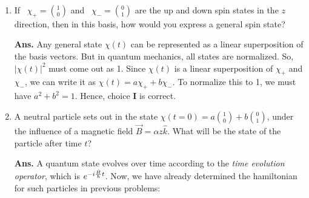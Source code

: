 \documentclass[12pt]{article}
\newcommand\ls{\left |}
\newcommand\rs{\right |}
\newcommand\tbf[1]{\textbf{#1}}
\newcommand\tans{\tbf{Ans. }}
\newcommand\h[1]{\hat{#1}}
\begin{document}
\begin{enumerate}[\bf 1.]
\vspace{1cm}
\item If ~$\chi_+ = { 1 \choose 0 }$ and ~$\chi_- = { 0 \choose 1 }$ are the up and down spin states in the $z$ direction, then in this basis, how would you express a general spin state?
\vspace{0.5cm}
\tans Any general state $\chi(t)$ can be represented as a linear superposition of the basis vectors. But in quantum mechanics, all states are normalized. So, $\ls \chi(t) \rs ^ 2$ must come out as 1. Since $\chi ( t )$ is a linear superposition of $\chi_+$ and $\chi_-$, we can write it as $\chi(t)=a \chi_+ + b \chi_-$. To normalize this to 1, we must have $a^2+b^2=1$. Hence, choice \tbf{I} is correct.
\vspace{1cm}
\item \label{prb:t_ev} A neutral particle sets out in the state $\chi(t=0) = a { 1 \choose 0 } + b { 0 \choose 1 }$, under the influence of a magnetic field $\vec{B} = \alpha z \h{k}$. What will be the state of the particle after time $t$?
\vspace{0.5cm}
\tans A quantum state evolves over time according to the {\it time evolution operator}, which is $e ^ {-i {\h{H} \over \hbar}t}$. Now, we have already determined the hamiltonian for such particles in previous problems:

\end{enumerate}
\end{document}
